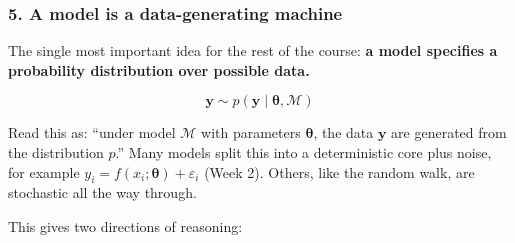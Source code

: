 \subsubsection{5. A model is a data-generating machine}

The single most important idea for the rest of the course: \textbf{a
model specifies a probability distribution over possible data.}

\[
\mathbf{y} \sim p(\mathbf{y} \mid \boldsymbol{\theta}, \mathcal{M})
\]

Read this as: ``under model \(\mathcal{M}\) with parameters
\(\boldsymbol{\theta}\), the data \(\mathbf{y}\) are generated from the
distribution \(p\).'' Many models split this into a deterministic core
plus noise, for example
\(y_i = f(x_i; \boldsymbol{\theta}) + \varepsilon_i\) (Week 2). Others,
like the random walk, are stochastic all the way through.

This gives two directions of reasoning:

